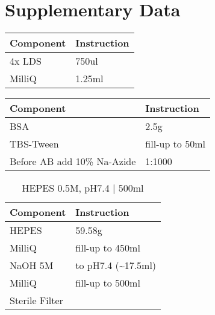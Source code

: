 \section{Supplementary Data}%
\begin{minipage}{0.3\linewidth}
\centering
{}
\begin{tabular}{ll}
\toprule
Component & Instruction \\
\midrule
   4x LDS &       750ul \\
   MilliQ &      1.25ml \\
\bottomrule
\end{tabular}
\end{minipage}

\begin{minipage}{0.3\linewidth}
\centering
{}
\begin{tabular}{ll}
\toprule
                 Component &     Instruction \\
\midrule
                       BSA &            2.5g \\
                 TBS-Tween & fill-up to 50ml \\
Before AB add 10\% Na-Azide &          1:1000 \\
\bottomrule
\end{tabular}
\end{minipage}


\begin{table}
\centering
\caption{HEPES 0.5M, pH7.4  |  500ml}
\begin{tabular}{ll}
\toprule
     Component &        Instruction \\
\midrule
         HEPES &             59.58g \\
        MilliQ &   fill-up to 450ml \\
       NaOH 5M & to pH7.4 (\textasciitilde 17.5ml) \\
        MilliQ &   fill-up to 500ml \\
Sterile Filter &                    \\
\bottomrule
\end{tabular}
\end{table}


